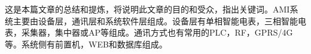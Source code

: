 \section*{}


 
\begin{CJK}{UTF8}{gbsn}
    这是本篇文章的总结和提炼，将说明此文章的目的和受众，指出关键词。AMI系统主要由设备层，通讯层和系统软件层组成。设备层有单相智能电表，三相智能电表，采集器，集中器或AP等组成。通讯方式也有常用的PLC，RF，GPRS/4G等。系统侧有前置机，WEB和数据库组成。
\end{CJK}
